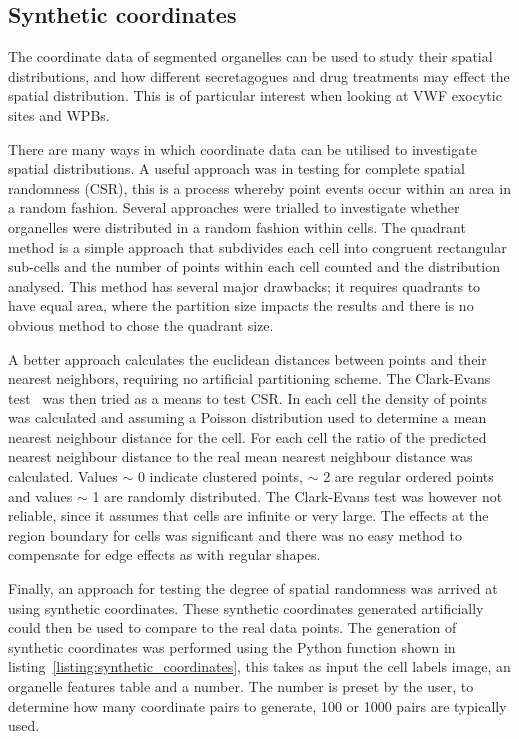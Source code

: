 \subsection{Synthetic coordinates}
\label{endothelial_morphometry:image_processing:synthetic_coordinates}
The coordinate data of segmented organelles can be used to study their spatial distributions, and how different secretagogues and drug treatments may effect the spatial distribution. This is of particular interest when looking at VWF exocytic sites and WPBs.

There are many ways in which coordinate data can be utilised to investigate spatial distributions. A useful approach was in testing for complete spatial randomness (CSR), this is a process whereby point events occur within an area in a random fashion. Several approaches were trialled to investigate whether organelles were distributed in a random fashion within cells. The quadrant method is a simple approach that subdivides each cell into congruent rectangular sub-cells and the number of points within each cell counted and the distribution analysed. This method has several major drawbacks; it requires quadrants to have equal area, where the partition size impacts the results and there is no obvious method to chose the quadrant size.

A better approach calculates the euclidean distances between points and their nearest neighbors, requiring no artificial partitioning scheme. The Clark-Evans test~\cite{Clark1954} was then tried as a means to test CSR. In each cell the density of points was calculated and assuming a Poisson distribution used to determine a mean nearest neighbour distance for the cell. For each cell the ratio of the predicted nearest neighbour distance to the real mean nearest neighbour distance was calculated. Values $\sim$ 0 indicate clustered points, $\sim$ 2 are regular ordered points and values $\sim$ 1 are randomly distributed. The Clark-Evans test was however not reliable, since it assumes that cells are infinite or very large. The effects at the region boundary for cells was significant and there was no easy method to compensate for edge effects as with regular shapes.

Finally, an approach for testing the degree of spatial randomness was arrived at using synthetic coordinates. These synthetic coordinates generated artificially could then be used to compare to the real data points. The generation of synthetic coordinates was performed using the Python function shown in listing~\ref{listing:synthetic_coordinates}, this takes as input the cell labels image, an organelle features table and a number. The number is preset by the user, to determine how many coordinate pairs to generate, 100 or 1000 pairs are typically used.

